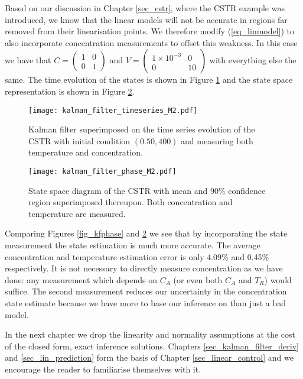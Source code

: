 Based on our discussion in Chapter \ref{sec_cstr}, where the CSTR example was introduced, we know that the linear models will not be accurate in regions far removed from their linearisation points. We therefore modify (\ref{eq_linmodel}) to also incorporate concentration measurements to offset this weakness. In this case we have that $C = \begin{pmatrix}
1 & 0\\0 &1
\end{pmatrix}$ and $V = \begin{pmatrix}
1\times 10^{-3} & 0\\0 & 10
\end{pmatrix}$ with everything else the same. The time evolution of the states is shown in Figure \ref{fig_kftime2} and the state space representation is shown in Figure \ref{fig_kfphase2}. 
\begin{figure}[H] 
\centering
\texttt{[image: kalman\_filter\_timeseries\_M2.pdf]}
\caption{Kalman filter superimposed on the time series evolution of the CSTR with initial condition $(0.50, 400)$ and measuring both temperature and concentration.}
\label{fig_kftime2}
\end{figure}
\begin{figure}[H] 
\centering
\texttt{[image: kalman\_filter\_phase\_M2.pdf]}
\caption{State space diagram of the CSTR with mean and 90\% confidence region superimposed thereupon. Both concentration and temperature are measured.}
\label{fig_kfphase2}
\end{figure}
Comparing Figures \ref{fig_kfphase} and \ref{fig_kfphase2} we see that by incorporating the state measurement the state estimation is much more accurate. The average concentration and temperature estimation error is only 4.09\% and 0.45\% respectively. It is not necessary to directly measure concentration as we have done: any measurement which depends on $C_A$ (or even both $C_A$ and $T_R$) would suffice. The second measurement reduces our uncertainty in the concentration state estimate because we have more to base our inference on than just a bad model.  

In the next chapter we drop the linearity and normality assumptions at the cost of the closed form, exact inference solutions. Chapters \ref{sec_kalman_filter_deriv} and \ref{sec_lin_prediction} form the basis of Chapter \ref{sec_linear_control} and we encourage the reader to familiarise themselves with it. 